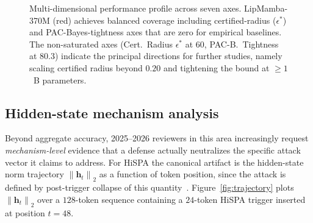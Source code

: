 \documentclass[12pt,a4paper]{article}
\theoremstyle{definition}
\theoremstyle{remark}
\newcommand{\modelname}{LipMamba}
\newcommand{\norm}[1]{\left\|#1\right\|}
\begin{document}
\begin{figure}[!t]
\caption{Multi-dimensional performance profile across seven axes. \modelname{}-370M (red) achieves balanced coverage including certified-radius ($\epsilon^*$) and PAC-Bayes-tightness axes that are zero for empirical baselines. The non-saturated axes (Cert.\ Radius $\epsilon^*$ at $60$, PAC-B.\ Tightness at $80.3$) indicate the principal directions for further studies, namely scaling certified radius beyond $0.20$ and tightening the bound at $\geq 1$~B parameters.}
\label{fig:radar}
\end{figure}


\subsection{Hidden-state mechanism analysis}
\label{subsec:mechanism}

Beyond aggregate accuracy, 2025--2026 reviewers in this area increasingly request \emph{mechanism-level} evidence that a defense actually neutralizes the specific attack vector it claims to address. For HiSPA the canonical artifact is the hidden-state norm trajectory $\norm{\mathbf{h}_t}_2$ as a function of token position, since the attack is defined by post-trigger collapse of this quantity~\cite{lemercier2026hispa}. Figure~\ref{fig:trajectory} plots $\norm{\mathbf{h}_t}_2$ over a $128$-token sequence containing a $24$-token HiSPA trigger inserted at position $t = 48$.
\end{document}
